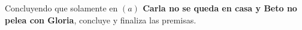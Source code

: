 \documentclass{article}
\begin{document}
\begin{enumerate}
		    Concluyendo que solamente en \textbf{ $(a)$ Carla no se queda en casa y Beto no pelea con Gloria}, concluye y finaliza las premisas.
		
	\end{enumerate}


	
	\clearpage
	
	
		
	
\end{document}
